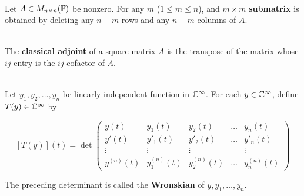 \begin{definition}
	\hfill\\
	Let $A \in M_{n \times n}(\mathbb{F})$ be nonzero. For any $m$ ($1 \leq m \leq n$), and $m \times m$ \textbf{submatrix} is obtained by deleting any $n - m$ rows and any $n - m$ columns of $A$.
\end{definition}

\begin{definition}
	\hfill\\
	The \textbf{classical adjoint} of a square matrix $A$ is the transpose of the matrix whose $ij$-entry is the $ij$-cofactor of $A$.
\end{definition}

\begin{definition}
	\hfill\\
	Let $y_1, y_2, \dots, y_n$ be linearly independent function in $\mathbb{C}^\infty$. For each $y \in \mathbb{C}^\infty$, define $T(y) \in \mathbb{C}^\infty$ by

	\[[T(y)](t) = \det\begin{pmatrix}
			y(t)       & y_1(t)       & y_2(t)       & \dots & y_n(t)       \\
			y'(t)      & y'_1(t)      & y'_2(t)      & \dots & y'_n(t)      \\
			\vdots     & \vdots       & \vdots       &       & \vdots       \\
			y^{(n)}(t) & y_1^{(n)}(t) & y_2^{(n)}(t) & \dots & y_n^{(n)}(t)
		\end{pmatrix}\]

	The preceding determinant is called the \textbf{Wronskian} of $y, y_1, \dots, y_n$.
\end{definition}
